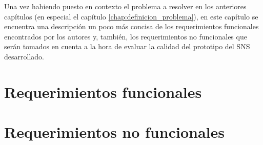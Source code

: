 Una vez habiendo puesto en contexto el problema a resolver en los anteriores capítulos (en especial el capítulo \ref{chap:definicion_problema}), en este capítulo se encuentra una descripción un poco más concisa de los requerimientos funcionales encontrados por los autores y, también, los requerimientos no funcionales que serán tomados en cuenta a la hora de evaluar la calidad del prototipo del SNS desarrollado.

\section{Requerimientos funcionales}


\section{Requerimientos no funcionales}
